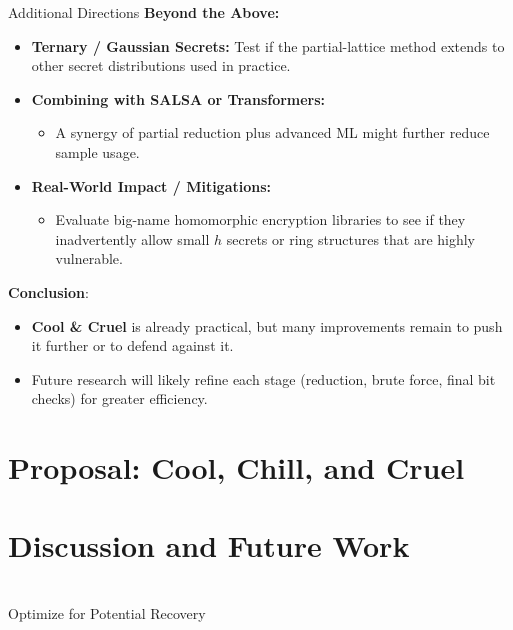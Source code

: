 \documentclass{beamer}
\begin{document}
\begin{frame}{Additional Directions}
  \textbf{Beyond the Above:}
  \begin{itemize}
    \item \textbf{Ternary / Gaussian Secrets:} 
      Test if the partial-lattice method extends to other secret distributions used in practice.
    \item \textbf{Combining with SALSA or Transformers:}
      \begin{itemize}
        \item A synergy of partial reduction plus advanced ML might further reduce sample usage.
      \end{itemize}
    \item \textbf{Real-World Impact / Mitigations:}
      \begin{itemize}
        \item Evaluate big-name homomorphic encryption libraries to see if they inadvertently allow 
              small $h$ secrets or ring structures that are highly vulnerable.
      \end{itemize}
  \end{itemize}

  \vspace{0.3cm}
  \textbf{Conclusion}:
  \begin{itemize}
    \item \textbf{Cool \& Cruel} is already practical, but many improvements remain to push it further
          or to defend against it.
    \item Future research will likely refine each stage (reduction, brute force, final bit checks) 
          for greater efficiency.
  \end{itemize}
\end{frame}
\section{Proposal: Cool, Chill, and Cruel}

\section{Discussion and Future Work}

\begin{frame}{}
     \\
    Optimize for Potential Recovery
\end{frame}
\end{document}
